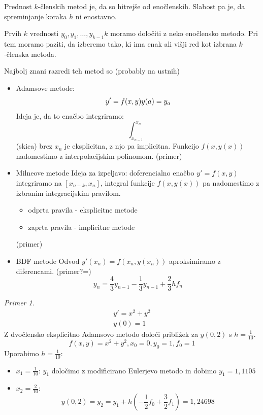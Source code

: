 \documentclass[a4paper,12pt]{article}
\theoremstyle{definition}
\theoremstyle{remark}
\newtheorem*{ex}{Primer}
\begin{document}
Prednost $k$-členskih metod je, da so hitrejše od enočlenskih. Slabost pa je, da spreminjanje koraka $h$ ni enostavno.

Prvih $k$ vrednosti $y_0, y_1, \dots, y_{k-1}k$ moramo določiti z neko enočlensko metodo. Pri tem moramo paziti, da izberemo tako, ki ima enak ali višji red kot izbrana $k$-členska metoda.

Najbolj znani razredi teh metod so (probably na ustnih)
\begin{itemize}
    \item Adamsove metode:
    \begin{equation*}
        y' = f(x, y) \\
        y(a) = y_a
    \end{equation*}
    Ideja je, da to enačbo integriramo:
    \begin{equation*}
        \int_{x_{n-1}}^{x_n} 
    \end{equation*}
    (skica)
    brez $x_n$ je eksplicitna, z njo pa implicitna. Funkcijo $f(x, y(x))$ nadomestimo z interpolacijskim polinomom.
    (primer)
    \item Milneove metode
    Ideja za izpeljavo: doferencialno enačbo $y' = f(x, y)$ integriramo na $[x_{n-k}, x_n]$, integral funkcije $f(x, y(x))$ pa nadomestimo
    z izbranim integracijskim pravilom.
    \begin{itemize}
        \item odprta pravila - eksplicitne metode
        \item zaprta pravila - implicitne metode
    \end{itemize}
    (primer)
    \item BDF metode
    Odvod $y'(x_n) = f(x_n, y(x_n))$ aproksimiramo z diferencami.
    (primer?=)
    \begin{equation*}
        y_n = \frac{4}{3} y_{n-1} - \frac{1}{3} y_{n-1} + \frac{2}{3} h f_n
    \end{equation*}
\end{itemize}

\begin{ex}
    \begin{gather*}
        y' = x^2 + y^2 \\
        y(0) = 1
    \end{gather*}
    Z dvočlensko eksplicitno Adamsovo metodo določi približek za $y(0, 2)$ s $h = \frac{1}{10}$.
    \begin{equation*}
        f(x, y) = x^2 + y^2, x_0 = 0, y_0 = 1, f_0 = 1
    \end{equation*}
    Uporabimo $h = \frac{1}{10}$:
    \begin{itemize}
        \item[] $x_1 = \frac{1}{10}$: $y_1$ določimo z modificirano Eulerjevo metodo in dobimo $y_1 = 1,1105$
        \item[] $x_2 = \frac{2}{10}$: 
        \begin{equation*}
            y(0, 2) = y_2 = y_1 + h(-\frac{1}{2} f_0 + \frac{3}{2} f_1) = 1,24698
        \end{equation*}
    \end{itemize}
\end{ex}
\end{document}
